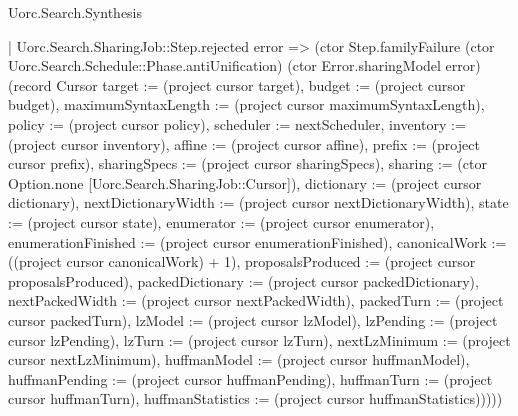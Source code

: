 \begin{lexlean}{Uorc.Search.Synthesis}
\begin{semanticmodule}
{          | Uorc.Search.SharingJob::Step.rejected error => (ctor Step.familyFailure (ctor Uorc.Search.Schedule::Phase.antiUnification) (ctor Error.sharingModel error) (record Cursor {target := (project cursor target), budget := (project cursor budget), maximumSyntaxLength := (project cursor maximumSyntaxLength), policy := (project cursor policy), scheduler := nextScheduler, inventory := (project cursor inventory), affine := (project cursor affine), prefix := (project cursor prefix), sharingSpecs := (project cursor sharingSpecs), sharing := (ctor Option.none [Uorc.Search.SharingJob::Cursor]), dictionary := (project cursor dictionary), nextDictionaryWidth := (project cursor nextDictionaryWidth), state := (project cursor state), enumerator := (project cursor enumerator), enumerationFinished := (project cursor enumerationFinished), canonicalWork := ((project cursor canonicalWork) + 1), proposalsProduced := (project cursor proposalsProduced), packedDictionary := (project cursor packedDictionary), nextPackedWidth := (project cursor nextPackedWidth), packedTurn := (project cursor packedTurn), lzModel := (project cursor lzModel), lzPending := (project cursor lzPending), lzTurn := (project cursor lzTurn), nextLzMinimum := (project cursor nextLzMinimum), huffmanModel := (project cursor huffmanModel), huffmanPending := (project cursor huffmanPending), huffmanTurn := (project cursor huffmanTurn), huffmanStatistics := (project cursor huffmanStatistics)}))))
}
\end{semanticmodule}
\end{lexlean}
